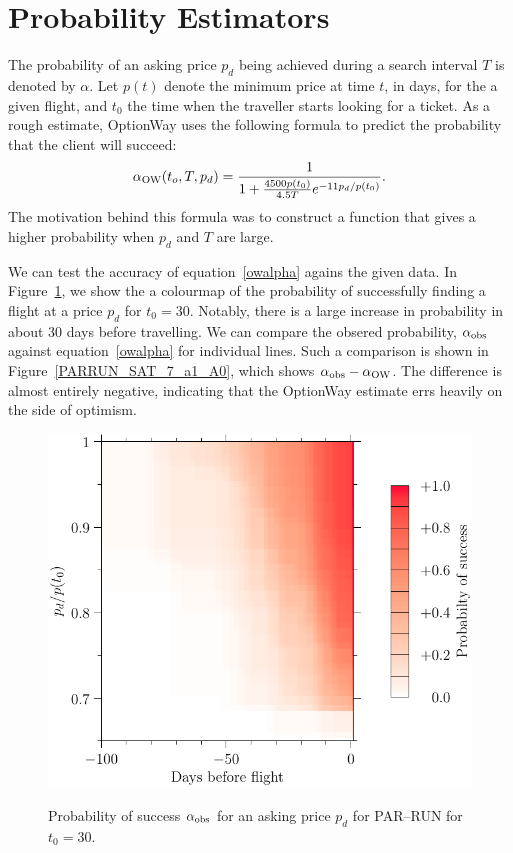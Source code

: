 \documentclass{article}
\begin{document}
\section{Probability Estimators}
The probability of an asking price $p_d$ being achieved during a
search interval $T$ is denoted by $\alpha$.  Let $p(t)$ denote the
minimum price at time $t$, in days, for the a given flight, and $t_0$
the time when the traveller starts looking for a ticket.  As a rough
estimate, OptionWay uses the following formula to predict the
probability that the client will succeed:
\begin{dmath}
  \alpha_{\rm{OW}}(t_o,T,p_d) = \frac{1}{1 + \frac{4500 p(t_0)}{4.5 T}e^{-11 p_d / p(t_0)}}.
  \label{owalpha}
\end{dmath}
The motivation behind this formula was to construct a function that
gives a higher probability when $p_d$ and $T$ are large.

We can test the accuracy of equation~\eqref{owalpha} agains the given
data.  In Figure~\ref{PARRUN_SAT_7_a0}, we show the a colourmap of the
probability of successfully finding a flight at a price $p_d$ for
$t_0=30$.  Notably, there is a large increase in probability in about
30 days before travelling.  We can compare the obsered probability,
$\alpha_{\rm{obs}}$ against equation~\eqref{owalpha} for individual lines.
Such a comparison is shown in Figure~\ref{PARRUN_SAT_7_a1_A0}, which
shows $\alpha_{\rm{obs}}-\alpha_{\rm{OW}}$.  The difference is almost
entirely negative, indicating that the OptionWay estimate errs heavily
on the side of optimism.
\begin{figure}
  \begin{center}
    \includegraphics{pdf/PARRUN_SAT_7_a0}
    \label{PARRUN_SAT_7_a0}
    \caption{Probability of success $\alpha_{\rm{obs}}$ for an asking
      price $p_d$ for PAR--RUN for $t_0=30$.}
  \end{center}
\end{figure}
\end{document}
